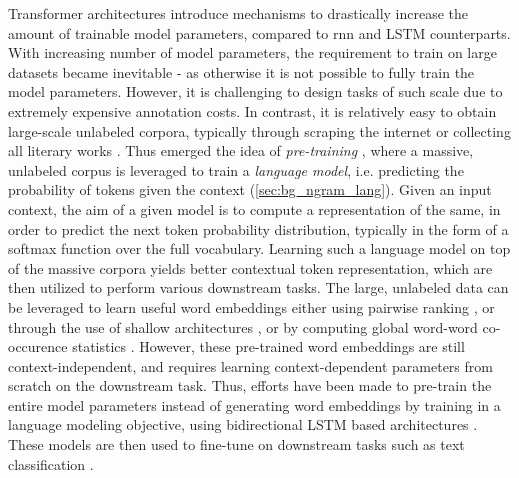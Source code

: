 \documentclass[letterpaper, 12pt]{report}
\begin{document}
Transformer architectures introduce mechanisms to drastically increase the amount of trainable model parameters, compared to \acrshort{rnn} and LSTM counterparts.
With increasing number of model parameters, the requirement to train on large datasets became inevitable - as otherwise it is not possible to fully train the model parameters. However, it is challenging to design tasks of such scale due to extremely expensive annotation costs. In contrast, it is relatively easy to obtain large-scale unlabeled corpora, typically through scraping the internet \cite{raffel2019exploring} or collecting all literary works \cite{zhu2015aligning}. Thus emerged the idea of \textit{pre-training} \citep{mikolov2013efficient, peters-etal-2018-deep}, where a massive, unlabeled corpus is leveraged to train a \textit{language model}, i.e. predicting the probability of tokens given the context (\autoref{sec:bg_ngram_lang}). Given an input context, the aim of a given model is to compute a representation of the same, in order to predict the next token probability distribution, typically in the form of a softmax function over the full vocabulary. Learning such a language model on top of the massive corpora yields better contextual token representation, which are then utilized to perform various downstream tasks. The large, unlabeled data can be leveraged to learn useful word embeddings either using pairwise ranking \citep{collobert2008unified}, or through the use of shallow architectures \citep{mikolov2013efficient}, or by computing global word-word co-occurence statistics \citep{pennington2014glove}. However, these pre-trained word embeddings are still context-independent, and requires learning context-dependent parameters from scratch on the downstream task. Thus, efforts have been made to pre-train the entire model parameters instead of generating word embeddings by training in a language modeling objective, using bidirectional LSTM based architectures \citep{peters2018deep}. These models are then used to fine-tune on downstream tasks such as text classification \citep{howard2018universal}.
\end{document}

